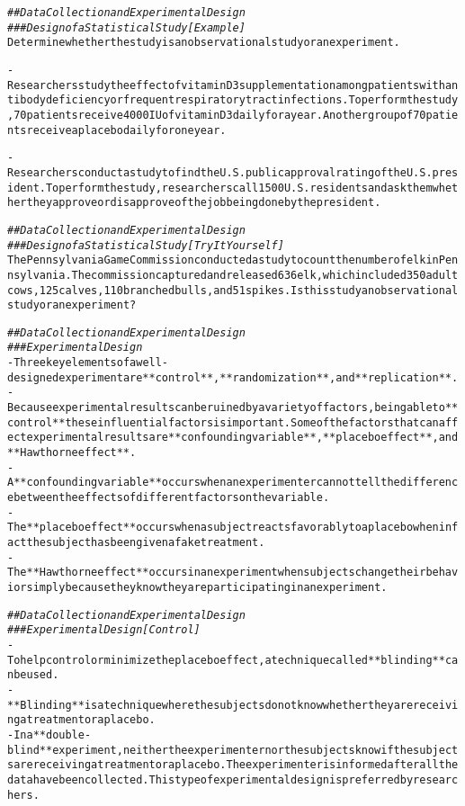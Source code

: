 \documentclass{article}\usepackage[]{graphicx}\usepackage[]{color}
\makeatletter
\newcommand{\hlcom}[1]{\textcolor[rgb]{0.678,0.584,0.686}{\textit{#1}}}%
\newenvironment{kframe}{%
 \def\at@end@of@kframe{}%
 \ifinner\ifhmode%
  \def\at@end@of@kframe{\end{minipage}}%
  \begin{minipage}{\columnwidth}%
 \fi\fi%
 \def\FrameCommand##1{\hskip\@totalleftmargin \hskip-\fboxsep
 \colorbox{shadecolor}{##1}\hskip-\fboxsep
     \hskip-\linewidth \hskip-\@totalleftmargin \hskip\columnwidth}%
 \MakeFramed {\advance\hsize-\width
   \@totalleftmargin\z@ \linewidth\hsize
   \@setminipage}}%
 {\par\unskip\endMakeFramed%
 \at@end@of@kframe}
\newenvironment{knitrout}{}{} %
\makeatother
\begin{document}
\begin{knitrout}
\begin{kframe}
\begin{alltt}
\hlcom{## Data Collection and Experimental Design}
\hlcom{### Design of a Statistical Study [Example]}
Determine whether the study is an observational study or an experiment.

- Researchers study the effect of vitamin D3 supplementation among patients with antibody deficiency or frequent respiratory tract infections. To perform the study, 70 patients receive 4000 IU of vitamin D3 daily for a year. Another group of 70 patients receive a placebo daily for one year.

- Researchers conduct a study to find the U.S. public approval rating of the U.S. president. To perform the study, researchers call 1500 U.S. residents and ask them whether they approve or disapprove of the job being done by the president.

\hlcom{## Data Collection and Experimental Design}
\hlcom{### Design of a Statistical Study [Try It Yourself]}
The Pennsylvania Game Commission conducted a study to count the number of elk in Pennsylvania. The commission captured and released 636 elk, which included 350 adult cows, 125 calves, 110 branched bulls, and 51 spikes. Is this study an observational study or an experiment?

\hlcom{## Data Collection and Experimental Design}
\hlcom{### Experimental Design}
- Three key elements of a well-designed experiment are **control**, **randomization**, and **replication**.
- Because experimental results can be ruined by a variety of factors, being able to **control** these influential factors is important. Some of the factors that can affect experimental results are **confounding variable**, **placebo effect**, and **Hawthorne effect**.
- A **confounding variable** occurs when an experimenter cannot tell the difference between the effects of different factors on the variable.
- The **placebo effect** occurs when a subject reacts favorably to a placebo when in fact the subject has been given a fake treatment. 
- The **Hawthorne effect** occurs in an experiment when subjects change their behavior simply because they know they are participating in an experiment.

\hlcom{## Data Collection and Experimental Design}
\hlcom{### Experimental Design [Control]}
- To help control or minimize the placebo effect, a technique called **blinding** can be used.
- **Blinding** is a technique where the subjects do not know whether they are receiving a treatment or a placebo. 
- In a **double-blind** experiment, neither the experimenter nor the subjects know if the subjects are receiving a treatment or a placebo. The experimenter is informed after all the data have been collected. This type of experimental design is preferred by researchers.


\end{alltt}
\end{kframe}
\end{knitrout}
\end{document}
